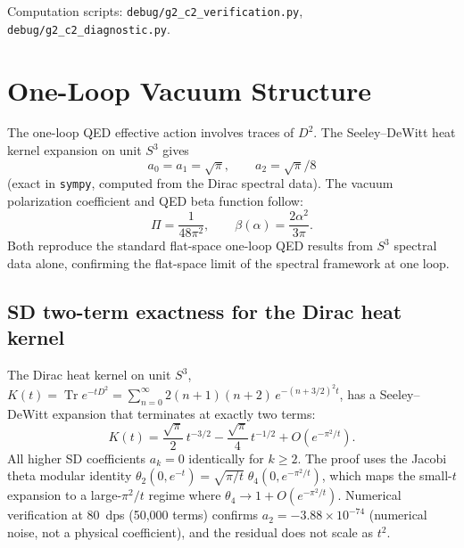 \documentclass[11pt]{article}
\begin{document}
Computation scripts: \texttt{debug/g2\_c2\_verification.py},
\texttt{debug/g2\_c2\_diagnostic.py}.

\section{One-Loop Vacuum Structure}
\label{sec:one_loop}

The one-loop QED effective action involves traces of $D^2$.
The Seeley--DeWitt heat kernel expansion on unit $S^3$ gives
\begin{equation}
  a_0 = a_1 = \sqrt{\pi}, \qquad a_2 = \sqrt{\pi}/8
  \label{eq:seeley_dewitt}
\end{equation}
(exact in \texttt{sympy}, computed from the Dirac spectral data).
The vacuum polarization coefficient and QED beta function follow:
\begin{equation}
  \Pi = \frac{1}{48\pi^2}, \qquad
  \beta(\alpha) = \frac{2\alpha^2}{3\pi}.
  \label{eq:one_loop}
\end{equation}
Both reproduce the standard flat-space one-loop QED results from
$S^3$ spectral data alone, confirming the flat-space limit of the
spectral framework at one loop.

\subsection{SD two-term exactness for the Dirac heat kernel}

The Dirac heat kernel on unit $S^3$,
$K(t) = \operatorname{Tr} e^{-tD^2}
       = \sum_{n=0}^{\infty} 2(n{+}1)(n{+}2)\,e^{-(n+3/2)^2 t}$,
has a Seeley--DeWitt expansion that terminates at exactly two terms:
\begin{equation}
  K(t) = \frac{\sqrt{\pi}}{2}\,t^{-3/2}
       - \frac{\sqrt{\pi}}{4}\,t^{-1/2}
       + O(e^{-\pi^2/t}).
  \label{eq:sd_two_term}
\end{equation}
All higher SD coefficients $a_k = 0$ identically for $k \geq 2$.
The proof uses the Jacobi theta modular identity
$\theta_2(0, e^{-t}) = \sqrt{\pi/t}\;\theta_4(0, e^{-\pi^2/t})$,
which maps the small-$t$ expansion to a large-$\pi^2/t$ regime where
$\theta_4 \to 1 + O(e^{-\pi^2/t})$.  Numerical verification at 80~dps
(50,000 terms) confirms $a_2 = -3.88 \times 10^{-74}$ (numerical
noise, not a physical coefficient), and the residual does not scale as
$t^2$.
\end{document}
